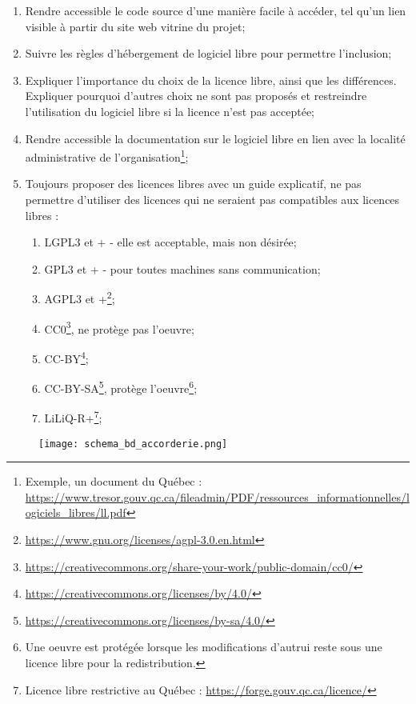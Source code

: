 \begin{enumerate}
    \item Rendre accessible le code source d'une manière facile à accéder, tel qu'un lien visible à partir du site web vitrine du projet;
    \item Suivre les règles d'hébergement de logiciel libre pour permettre l'inclusion;
    \item Expliquer l'importance du choix de la licence libre, ainsi que les différences. Expliquer pourquoi d'autres choix ne sont pas proposés et restreindre l'utilisation du logiciel libre si la licence n'est pas acceptée;
    \item Rendre accessible la documentation sur le logiciel libre en lien avec la localité administrative de l'organisation\footnote{Exemple, un document du Québec : \url{https://www.tresor.gouv.qc.ca/fileadmin/PDF/ressources_informationnelles/logiciels_libres/ll.pdf}};
    \item Toujours proposer des licences libres avec un guide explicatif, ne pas permettre d'utiliser des licences qui ne seraient pas compatibles aux licences libres :
    \begin{enumerate}
        \item LGPL3 et + - elle est acceptable, mais non désirée;
        \item GPL3 et + - pour toutes machines sans communication;
        \item AGPL3 et +\footnote{\url{https://www.gnu.org/licenses/agpl-3.0.en.html}};
        \item CC0\footnote{\url{https://creativecommons.org/share-your-work/public-domain/cc0/}}, ne protège pas l'oeuvre;
        \item CC-BY\footnote{\url{https://creativecommons.org/licenses/by/4.0/}};
        \item CC-BY-SA\footnote{\url{https://creativecommons.org/licenses/by-sa/4.0/}}, protège l'oeuvre\footnote{Une oeuvre est protégée lorsque les modifications d'autrui reste sous une licence libre pour la redistribution.};
        \item LiLiQ-R+\footnote{Licence libre restrictive au Québec : \url{https://forge.gouv.qc.ca/licence/}};
    \end{enumerate}
\end{enumerate}

 \label{annexe_db_accorderie_2019}

\begin{figure}[htb]
\centering
\texttt{[image: schema\_bd\_accorderie.png]}
\end{figure}

